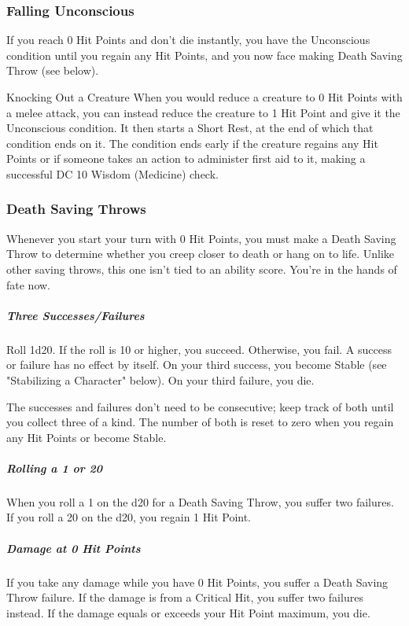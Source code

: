 \documentclass[10pt,a4paper,twoside,bg=print,twocolumn,openany,nodeprecatedcode]{dndbook}
\begin{document}
\subsubsection{Falling Unconscious}
If you reach 0 Hit Points and don't die instantly, you have the Unconscious condition until you regain any Hit Points, and you now face making Death Saving Throw (see below).

\begin{DndSidebar}[float=!b]{Knocking Out a Creature}
When you would reduce a creature to 0 Hit Points with a melee attack, you can instead reduce the creature to 1 Hit Point and give it the Unconscious condition. It then starts a Short Rest, at the end of which that condition ends on it. The condition ends early if the creature regains any Hit Points or if someone takes an action to administer first aid to it, making a successful DC 10 Wisdom (Medicine) check.



\end{DndSidebar}

\subsubsection{Death Saving Throws}
Whenever you start your turn with 0 Hit Points, you must make a Death Saving Throw to determine whether you creep closer to death or hang on to life. Unlike other saving throws, this one isn't tied to an ability score. You're in the hands of fate now.

\subparagraph{Three Successes/Failures}
Roll 1d20. If the roll is 10 or higher, you succeed. Otherwise, you fail. A success or failure has no effect by itself. On your third success, you become Stable (see "Stabilizing a Character" below). On your third failure, you die.

The successes and failures don't need to be consecutive; keep track of both until you collect three of a kind. The number of both is reset to zero when you regain any Hit Points or become Stable.

\subparagraph{Rolling a 1 or 20}
When you roll a 1 on the d20 for a Death Saving Throw, you suffer two failures. If you roll a 20 on the d20, you regain 1 Hit Point.

\subparagraph{Damage at 0 Hit Points}
If you take any damage while you have 0 Hit Points, you suffer a Death Saving Throw failure. If the damage is from a Critical Hit, you suffer two failures instead. If the damage equals or exceeds your Hit Point maximum, you die.
\end{document}
